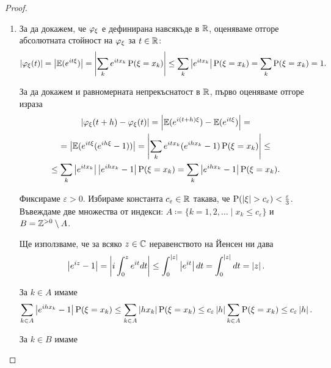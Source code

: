 \documentclass[numbers=endperiod, DIV=15, bibliography=totocnumbered]{scrartcl}
\begin{document}
\begin{proof}
  \mbox{}
  \begin{enumerate}
    \item За да докажем, че $\varphi_\xi$ е дефинирана навсякъде в $\mathbb{R}$, оценяваме отгоре абсолютната стойност на $\varphi_\xi$ за $t \in \mathbb{R}$:
    \begin{displaymath}
      \left\vert \varphi_\xi(t) \right\vert
      =
      \left\vert \mathbb{E}(e^{it\xi}) \right\vert
      =
      \left\vert \sum_k e^{it x_k} \operatorname{P}(\xi = x_k) \right\vert
      \leq
      \sum_k \left\vert e^{it x_k} \right\vert \operatorname{P}(\xi = x_k)
      =
      \sum_k \operatorname{P}(\xi = x_k)
      =
      1.
    \end{displaymath}

    За да докажем и равномерната непрекъснатост в $\mathbb{R}$, първо оценяваме отгоре израза
    \begin{multline*}
      \left\vert \varphi_\xi(t + h) - \varphi_\xi(t) \right\vert
      =
      \left\vert \mathbb{E}(e^{i(t + h)\xi}) - \mathbb{E}(e^{it\xi}) \right\vert
      = \\ =
      \left\vert \mathbb{E}(e^{it\xi} (e^{ih\xi} - 1)) \right\vert
      =
      \left\vert \sum_k e^{it x_k} (e^{ih x_k} - 1) \operatorname{P}(\xi = x_k) \right\vert
      \leq \\ \leq
      \sum_k \left\vert e^{it x_k} \right\vert \left\vert e^{ih x_k} - 1 \right\vert \operatorname{P}(\xi = x_k)
      =
      \sum_k \left\vert e^{ih x_k} - 1 \right\vert \operatorname{P}(\xi = x_k).
    \end{multline*}

    Фиксираме $\varepsilon > 0$. Избираме константа $c_\varepsilon \in \mathbb{R}$ такава, че $\operatorname{P}(\left\vert \xi \right\vert > c_\varepsilon) < \frac \varepsilon 3$.
    Въвеждаме две множества от индекси: $A \coloneqq \{ k = 1, 2, \ldots \mid x_k \leq c_\varepsilon \}$ и $B = \mathbb{Z}^{> 0} \setminus A$.

    Ще използваме, че за всяко $z \in \mathbb{C}$ неравенството на Йенсен ни дава
    \begin{displaymath}
      \left\vert e^{iz} - 1 \right\vert
      =
      \left\vert i \int_0^z e^{it} dt \right\vert
      \leq
      \int_0^{\left\vert z \right\vert} \left\vert e^{it} \right\vert dt
      =
      \int_0^{\left\vert z \right\vert} dt
      =
      \left\vert z \right\vert.
    \end{displaymath}

    За $k \in A$ имаме
    \begin{displaymath}
      \sum_{k \in A} \left\vert e^{ih x_k} - 1 \right\vert \operatorname{P}(\xi = x_k)
      \leq
      \sum_{k \in A} \left\vert h x_k \right\vert \operatorname{P}(\xi = x_k)
      \leq
      c_\varepsilon \left\vert h \right\vert \sum_{k \in A} \operatorname{P}(\xi = x_k)
      \leq
      c_\varepsilon \left\vert h \right\vert.
    \end{displaymath}

    За $k \in B$ имаме


\end{enumerate}
\end{proof}
\end{document}

